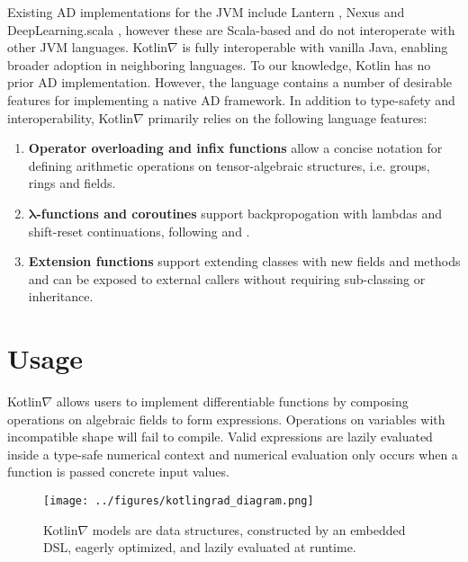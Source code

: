 \documentclass{article}
\begin{document}
Existing AD implementations for the JVM include Lantern \cite{wang2018demystifying}, Nexus \cite{chen2017typesafe} and DeepLearning.scala \cite{yang2018dl4s}, however these are Scala-based and do not interoperate with other JVM languages. Kotlin$\nabla$ is fully interoperable with vanilla Java, enabling broader adoption in neighboring languages. To our knowledge, Kotlin has no prior AD implementation. However, the language contains a number of desirable features for implementing a native AD framework. In addition to type-safety and interoperability, Kotlin$\nabla$ primarily relies on the following language features:
\begin{enumerate}[itemsep=-0.5ex]
  \item \textbf{Operator overloading and infix functions} allow a concise notation for defining arithmetic operations on tensor-algebraic structures, i.e. groups, rings and fields.
  \item \textbf{$\mathbf{\lambda}$-functions and coroutines} support backpropogation with lambdas and shift-reset continuations, following \citealt{pearlmutter2008reverse} and \citealt{wang2018demystifying}.
  \item \textbf{Extension functions} support extending classes with new fields and methods and can be exposed to external callers without requiring sub-classing or inheritance.
\end{enumerate}
\squeezeup\squeezeup
\section{Usage}

Kotlin$\nabla$ allows users to implement differentiable functions by composing operations on algebraic fields to form expressions. Operations on variables with incompatible shape will fail to compile. Valid expressions are lazily evaluated inside a type-safe numerical context and numerical evaluation only occurs when a function is passed concrete input values.

\squeezeup\begin{figure}[!htb]
\texttt{[image: ../figures/kotlingrad\_diagram.png]}
\squeezeup\caption{Kotlin$\nabla$ models are data structures, constructed by an embedded DSL, eagerly optimized, and lazily evaluated at runtime.}\squeezeup
\end{figure}
\end{document}
